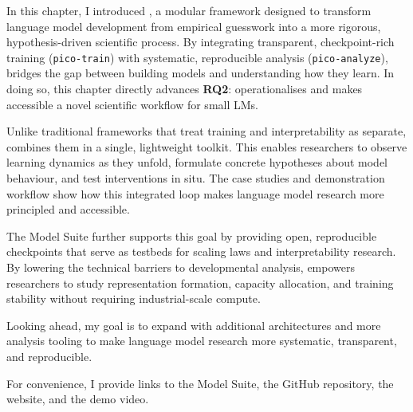 

In this chapter, I introduced \pico, a modular framework designed to transform language model development from empirical guesswork into a more rigorous, hypothesis-driven scientific process. By integrating transparent, checkpoint-rich training (\texttt{pico-train}) with systematic, reproducible analysis (\texttt{pico-analyze}), \pico bridges the gap between building models and understanding how they learn. In doing so, this chapter directly advances \textbf{RQ2}: \pico operationalises and makes accessible a novel scientific workflow for small LMs.

Unlike traditional frameworks that treat training and interpretability as separate, \pico combines them in a single, lightweight toolkit. This enables researchers to observe learning dynamics as they unfold, formulate concrete hypotheses about model behaviour, and test interventions in situ. The case studies and demonstration workflow show how this integrated loop makes language model research more principled and accessible.

The \pico Model Suite further supports this goal by providing open, reproducible checkpoints that serve as testbeds for scaling laws and interpretability research. By lowering the technical barriers to developmental analysis, \pico empowers researchers to study representation formation, capacity allocation, and training stability without requiring industrial-scale compute.

Looking ahead, my goal is to expand \pico with additional architectures and more analysis tooling to make language model research more systematic, transparent, and reproducible.


\vspace{1em}
For convenience, I provide links to the \pico Model Suite, the \pico GitHub repository, the \pico website, and the \pico demo video.

